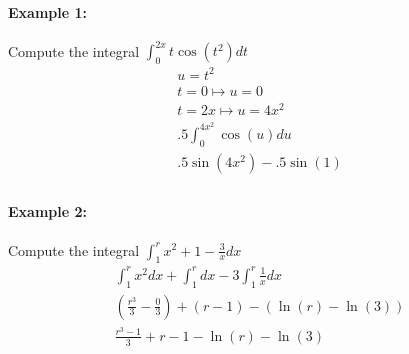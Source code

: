 \documentclass[../revisedmain.tex]{subfiles}
\begin{document}
\paragraph{Example 1:}Compute the integral $\int_{0}^{2x}t\cos(t^2)dt$
\begin{gather*}
	u=t^2\\
	t=0\mapsto u=0\\
	t=2x\mapsto u=4x^2\\
	.5\int_{0}^{4x^2}\cos(u)du\\
	.5\sin(4x^2)-.5\sin(1)\\
\end{gather*}
\paragraph{Example 2:}Compute the integral $\int_{1}^{r}x^2+1-\frac{3}{x}dx$
\begin{gather*}
	\int_{1}^{r}x^2dx+\int_{1}^{r}dx-3\int_{1}^{r}\frac{1}{x}dx\\
	\left(\frac{r^3}{3}-\frac{0}{3}\right)+(r-1)-(\ln(r)-\ln(3))\\
	\frac{r^3-1}{3}+r-1-\ln(r)-\ln(3)\\
\end{gather*}
\end{document}
